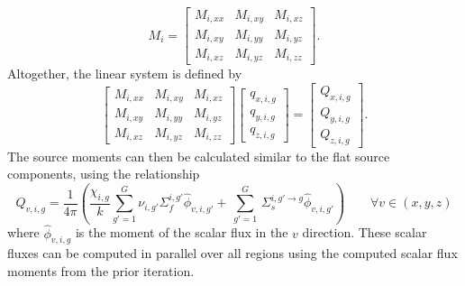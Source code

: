\begin{equation}
M_i = 
\begin{bmatrix}
M_{i,xx} & M_{i,xy}  & M_{i,xz} \\
M_{i,xy} & M_{i,yy}  & M_{i,yz} \\
M_{i,xz} & M_{i,yz}  & M_{i,zz}
\end{bmatrix}.
\label{eq:linear-moment-matrix}
\end{equation}
Altogether, the linear system is defined by
\begin{equation}
\begin{bmatrix}
M_{i,xx} & M_{i,xy}  & M_{i,xz} \\
M_{i,xy} & M_{i,yy}  & M_{i,yz} \\
M_{i,xz} & M_{i,yz}  & M_{i,zz}
\end{bmatrix}
\begin{bmatrix}
q_{x,i,g} \\
q_{y,i,g} \\
q_{z,i,g}
\end{bmatrix}
=
\begin{bmatrix}
Q_{x,i,g} \\
Q_{y,i,g} \\
Q_{z,i,g}
\end{bmatrix}
.
\label{eq:moments-linear-sys}
\end{equation}
The source moments can then be calculated similar to the flat source components, using the relationship
\begin{equation}
Q_{v,i,g} = \frac{1}{4 \pi} \left( \frac{\chi_{i,g}}{k} \sum_{g'=1}^{G} \nu_{i,g'} \Sigma_f^{i,g'} \hat{\phi}_{v,i,g'} + \, \sum_{g'=1}^G \,  \Sigma_{s}^{i,g' \rightarrow g} \hat{\phi}_{v,i,g'} \right) \qquad \forall v \in (x,y,z)
\end{equation}
where $\hat{\phi}_{v,i,g}$ is the moment of the scalar flux in the $v$ direction. These scalar fluxes can be computed in parallel over all regions using the computed scalar flux moments from the prior iteration.


